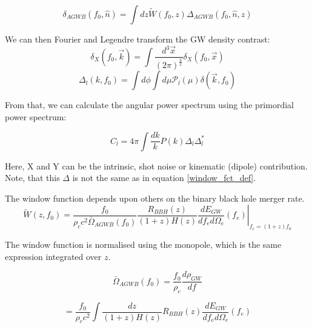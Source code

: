 \begin{equation}
\label{window_fct_int}
    \delta_{AGWB}(f_0, \hat{n})=\int dz \tilde{W}(f_0, z)\Delta_{AGWB}(f_0, \hat{n}, z)
\end{equation}


We can then Fourier and Legendre transform the GW density contrast:
\begin{equation}
    \delta_X(f_0, \vec{k}) = \int \frac{d^3\vec{x}}{(2\pi)^\frac{3}{2}} 
    \delta_X(f_0, \vec{x})
\end{equation}
\begin{equation}
    \Delta_l(k, f_0) = \int d\phi \int d\mu \mathcal{P}_l(\mu) 
    \delta(\vec{k}, f_0)
\end{equation}

From that, we can calculate the angular power spectrum using the primordial power 
spectrum:

\begin{equation}
    C_l = 4\pi \int \frac{dk}{k} P(k) \Delta_l \Delta_l^*
\end{equation}

Here, X and Y can be the intrinsic, shot noise or kinematic (dipole) contribution.
Note, that this $\Delta$ is not the same as in equation \ref{window_fct_def}.

The window function depends upon others on the binary black hole merger rate.
\begin{equation}
\label{window}
    \tilde{W}(z, f_0)=\frac{f_0}{\rho_c c^2 \bar{\Omega}_{AGWB}(f_0)}
    \frac{R_{BBH}(z)}{(1+z)H(z)} \left. \frac{dE_{GW}}{df_e d\Omega_e}(f_e)\right|_{f_e=(1+z)f_0}
\end{equation}

The window function is normalised using the monopole, which is the same expression integrated over $z$.

\begin{equation}
    \bar{\Omega}_{AGWB}(f_0)= \frac{f_0}{\rho_c}\frac{d\rho_{GW}}{df}
\end{equation}

\begin{equation}
    = \frac{f_0}{\rho_c c^2 } \int \frac{dz}{(1+z)H(z)} R_{BBH}(z) \frac{dE_{GW}}{df_e d\Omega_e}(f_e)
\end{equation}

